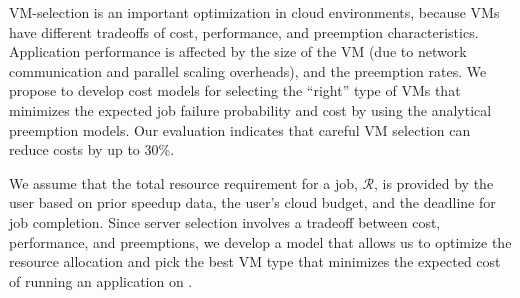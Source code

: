 VM-selection is an important optimization in cloud environments, because VMs have different tradeoffs of cost, performance, and preemption characteristics. 
Application performance is affected by the size of the VM (due to network communication and parallel scaling overheads), and the preemption rates. 
We propose to develop cost models for selecting the ``right'' type of  VMs that minimizes the expected job failure probability and cost by using the analytical preemption models. 
Our evaluation indicates that careful VM selection can reduce costs by  up to 30\%. 





We assume that the total resource requirement for a job, $\mathcal{R}$, is provided by the user based on prior speedup data, the user's cloud budget, and the deadline for job completion.
%
Since server selection involves a tradeoff between cost, performance, and preemptions, we develop a model that allows us to optimize the resource allocation and pick the best VM type that minimizes the expected cost of running an application on \sysname. 



